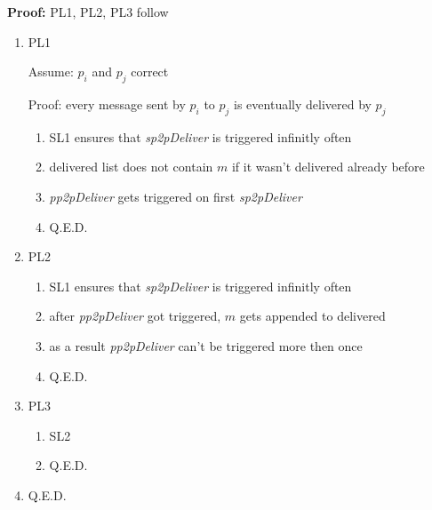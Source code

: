 \documentclass[a4paper]{article}
\begin{document}
\noindent
\textbf{Proof:} PL1, PL2, PL3 follow
\begin{enumerate}
    \item
        PL1

        Assume: $p_i$ and $p_j$ correct

        Proof: every message sent by $p_i$ to $p_j$ is eventually delivered by $p_j$
        \begin{enumerate}
            \item
                SL1 ensures that \textit{sp2pDeliver} is triggered infinitly often
            \item
                delivered list does not contain $m$ if it wasn't delivered already before
            \item
                \textit{pp2pDeliver} gets triggered on first \textit{sp2pDeliver}
            \item
                Q.E.D.
        \end{enumerate}
    \item
        PL2
        \begin{enumerate}
            \item
                SL1 ensures that \textit{sp2pDeliver} is triggered infinitly often
            \item
                after \textit{pp2pDeliver} got triggered, $m$ gets appended to delivered
            \item
                as a result \textit{pp2pDeliver} can't be triggered more then once
            \item
                Q.E.D.
        \end{enumerate}
    \item
        PL3
        \begin{enumerate}
            \item
                SL2
            \item
                Q.E.D.
        \end{enumerate}
    \item Q.E.D.

\end{enumerate}
\end{document}
